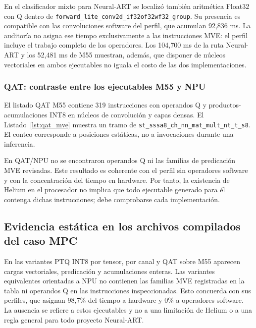 \noindent\begin{minipage}{\linewidth}

\end{minipage}

En el clasificador mixto para Neural-ART se localizó también aritmética Float32 con Q dentro de \texttt{forward\_\allowbreak lite\_\allowbreak conv2d\_\allowbreak if32of32wf32\_\allowbreak group}. Su presencia es compatible con las convoluciones software del perfil, que acumulan 92,836 ms. La auditoría no asigna ese tiempo exclusivamente a las instrucciones MVE: el perfil incluye el trabajo completo de los operadores. Los 104,700 ms de la ruta Neural-ART y los 52,481 ms de M55 muestran, además, que disponer de núcleos vectoriales en ambos ejecutables no iguala el costo de las dos implementaciones.


\subsubsection{QAT: contraste entre los ejecutables M55 y NPU}
El listado QAT M55 contiene 319 instrucciones con operandos Q y productos-acumulaciones INT8 en núcleos de convolución y capas densas. El Listado~\ref{lst:qat_mve} muestra un tramo de \texttt{st\_\allowbreak sssa8\_\allowbreak ch\_\allowbreak nn\_\allowbreak mat\_\allowbreak mult\_\allowbreak nt\_\allowbreak t\_\allowbreak s8}. El conteo corresponde a posiciones estáticas, no a invocaciones durante una inferencia.

\noindent\begin{minipage}{\linewidth}

\end{minipage}
En QAT/NPU no se encontraron operandos Q ni las familias de predicación MVE revisadas. Este resultado es coherente con el perfil sin operadores software y con la concentración del tiempo en hardware. Por tanto, la existencia de Helium en el procesador no implica que todo ejecutable generado para él contenga dichas instrucciones; debe comprobarse cada implementación.

\FloatBarrier
\subsection{Evidencia estática en los archivos compilados del caso MPC}\label{sec:cap4_evidencia}

En las variantes PTQ INT8 por tensor, por canal y QAT sobre M55 aparecen cargas vectoriales, predicación y acumulaciones enteras. Las variantes equivalentes orientadas a NPU no contienen las familias MVE registradas en la tabla ni operandos Q en las instrucciones inspeccionadas. Esto concuerda con sus perfiles, que asignan 98,7\% del tiempo a hardware y 0\% a operadores software. La ausencia se refiere a estos ejecutables y no a una limitación de Helium o a una regla general para todo proyecto Neural-ART.

